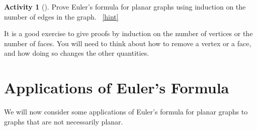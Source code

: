 \documentclass[10pt,]{book}
\theoremstyle{plain}
\theoremstyle{definition}
\theoremstyle{definition}
\theoremstyle{definition}
\newtheorem{activity}[project]{Activity}
\numberwithin{equation}{chapter}
\begin{document}
\begin{activity}[]\label{activity-285}
\hypertarget{p-1506}{}%
Prove Euler's formula for planar graphs using induction on the number of edges in the graph.%
~\hfill{\tiny\hyperlink{a-290}{[hint]}\hypertarget{q-290}{}}\end{activity}
\hypertarget{p-1508}{}%
It is a good exercise to give proofs by induction on the number of vertices or the number of faces.  You will need to think about how to remove a vertex or a face, and how doing so changes the other quantities.%
\typeout{************************************************}
\typeout{************************************************}
\section[{Applications of Euler's Formula}]{Applications of Euler's Formula}\label{sec_eulerapps}
\hypertarget{p-1509}{}%
We will now consider some applications of Euler's formula for planar graphs to graphs that are not necessarily planar.%
\typeout{************************************************}
\typeout{************************************************}
\end{document}
